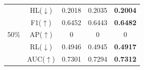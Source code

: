 \documentclass[12pt,a4paper,oneside,english]{report}
\begin{document}
\begin{table}[htbp]
\begin{center}
\begin{minipage}{0.48\linewidth}
\begin{tabular}{|c|c|c|c|c|}
                \hline
                & HL(\(\downarrow\)) & 0.2018 & 0.2035 & \textbf{0.2004} \\
                & F1(\(\uparrow\))   & 0.6452 & 0.6443 & \textbf{0.6482} \\
                50\% & AP(\(\uparrow\)) & 0 & 0 & 0 \\
                & RL(\(\downarrow\)) & 0.4946 & 0.4945 & \textbf{0.4917} \\
                & AUC(\(\uparrow\))  & 0.7301 & 0.7294 & \textbf{0.7312} \\
                \hline
            \end{tabular}
        \end{minipage}
    \end{center}
\end{table}


			
			
			
			
			
\end{document}
